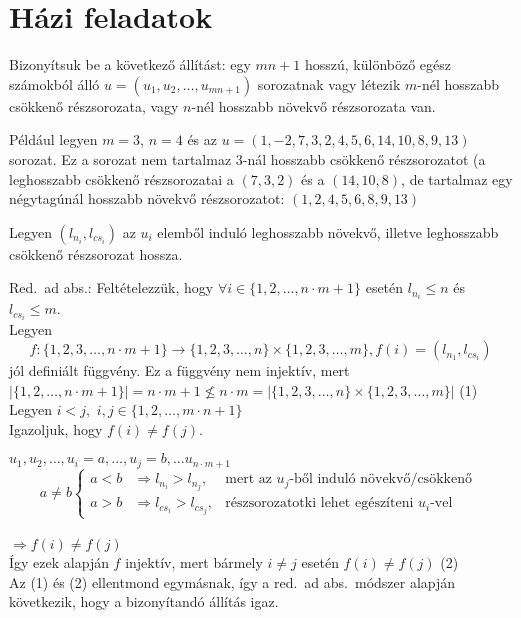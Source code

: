 \section*{Házi feladatok}
\begin{problem}
	Bizonyítsuk be a következő állítást: egy $mn+1$ hosszú, különböző
	egész számokból álló $u=(u_{1},u_{2},\dots,u_{mn+1})$ sorozatnak
	vagy létezik $m$-nél hosszabb csökkenő részsorozata, vagy $n$-nél
	hosszabb növekvő részsorozata van.
	
	Például legyen $m=3$, $n=4$ és az $u=(1,-2,7,3,2,4,5,6,14,10,8,9,13)$
	sorozat. Ez a sorozat nem tartalmaz $3$-nál hosszabb csökkenő részsorozatot
	(a leghosszabb csökkenő részsorozatai a $(7,3,2)$ és a $(14,10,8)$,
	de tartalmaz egy négytagúnál hosszabb növekvő részsorozatot: $(1,2,4,5,6,8,9,13)$ 
\end{problem}
\begin{solution}
	Legyen $(l_{n_{i}},l_{cs_{i}})$ az $u_{i}$ elemből induló leghosszabb
	növekvő, illetve leghosszabb csökkenő részsorozat hossza.
	
	Red.~ad abs.: Feltételezzük, hogy $\forall i\in\{1,2,\ldots,n\cdot m+1\}$
	esetén $l_{n_{i}}\leq n$ és $l_{cs_{i}}\leq m$. \\
	Legyen 
	\[
	f:\{1,2,3,\ldots,n\cdot m+1\}\rightarrow\{1,2,3,\ldots,n\}\times\{1,2,3,\ldots,m\},f(i)=(l_{n_{1}},l_{cs_{i}})
	\]
	jól definiált függvény. Ez a függvény nem injektív, mert \\
	$|\{1,2,\ldots,n\cdot m+1\}|=n\cdot m+1\not\leq n\cdot m=|\{1,2,3,\ldots,n\}\times\{1,2,3,\ldots,m\}|$
	(1) \\
	Legyen $i<j,$ $i,j\in\{1,2,\ldots,m\cdot n+1\}$ \\
	Igazoljuk, hogy $f(i)\neq f(j)$.
	
	$u_{1},u_{2},\ldots,u_{i}=a,\ldots,u_{j}=b,\ldots u_{n\cdot m+1}$
	\\
	
	\[
	a\neq b\left\{ \begin{array}{lll}
		a<b & \Rightarrow l_{n_{i}}>l_{n_{j}}, & \text{mert az }u_{j}\text{-ből induló növekvő/csökkenő }\\
		a>b & \Rightarrow l_{cs_{i}}>l_{cs_{j}}, & \text{részsorozatotki lehet egészíteni }u_{i}\text{-vel}
	\end{array}\right.
	\]
	\\
	$\Rightarrow f(i)\neq f(j)$ \\
	Így ezek alapján $f$ injektív, mert bármely $i\neq j$ esetén $f(i)\neq f(j)$
	(2) \\
	Az (1) és (2) ellentmond egymásnak, így a red.~ad abs.~módszer
	alapján következik, hogy a bizonyítandó állítás igaz. 
\end{solution}

